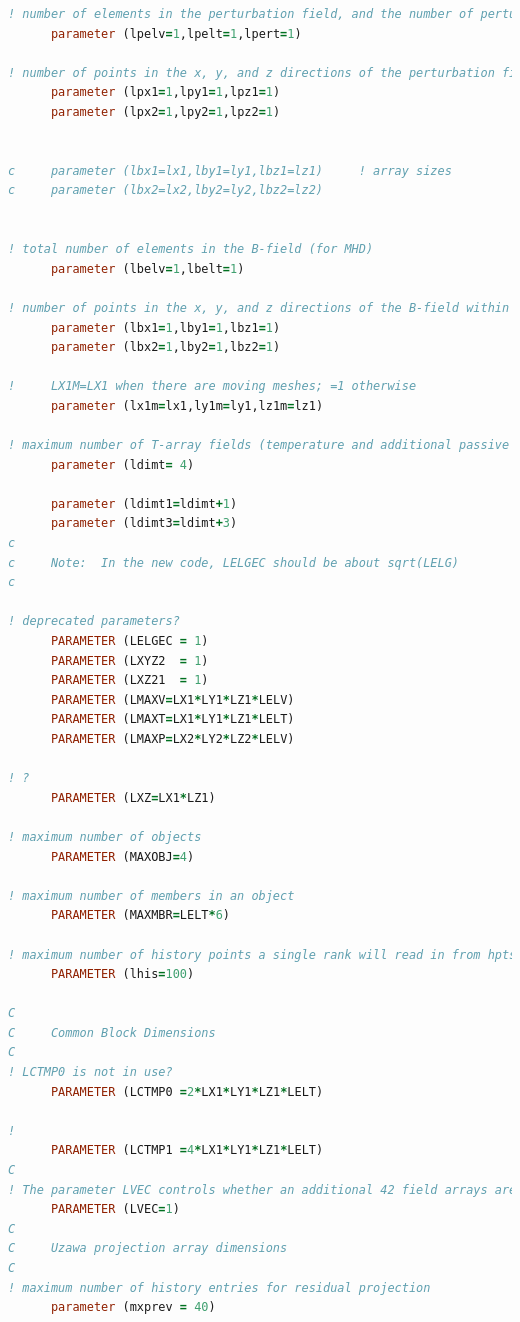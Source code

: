 \documentclass[10pt]{article}
\numberwithin{equation}{section} %
\begin{document}
\begin{itemize}
\begin{lstlisting}[language=Fortran]
! number of elements in the perturbation field, and the number of perturbation fields
      parameter (lpelv=1,lpelt=1,lpert=1)
   
! number of points in the x, y, and z directions of the perturbation field within each element of mesh 1 and mesh 2   
      parameter (lpx1=1,lpy1=1,lpz1=1)
      parameter (lpx2=1,lpy2=1,lpz2=1)


c     parameter (lbx1=lx1,lby1=ly1,lbz1=lz1)     ! array sizes
c     parameter (lbx2=lx2,lby2=ly2,lbz2=lz2)


! total number of elements in the B-field (for MHD)
      parameter (lbelv=1,lbelt=1)

! number of points in the x, y, and z directions of the B-field within each element of mesh 1 and mesh 2
      parameter (lbx1=1,lby1=1,lbz1=1)
      parameter (lbx2=1,lby2=1,lbz2=1)

!     LX1M=LX1 when there are moving meshes; =1 otherwise
      parameter (lx1m=lx1,ly1m=ly1,lz1m=lz1)

! maximum number of T-array fields (temperature and additional passive scalars)
      parameter (ldimt= 4)    

      parameter (ldimt1=ldimt+1)
      parameter (ldimt3=ldimt+3)
c
c     Note:  In the new code, LELGEC should be about sqrt(LELG)
c

! deprecated parameters?
      PARAMETER (LELGEC = 1)
      PARAMETER (LXYZ2  = 1)
      PARAMETER (LXZ21  = 1)
      PARAMETER (LMAXV=LX1*LY1*LZ1*LELV)
      PARAMETER (LMAXT=LX1*LY1*LZ1*LELT)
      PARAMETER (LMAXP=LX2*LY2*LZ2*LELV)

! ?      
      PARAMETER (LXZ=LX1*LZ1)

! maximum number of objects
      PARAMETER (MAXOBJ=4)

! maximum number of members in an object
      PARAMETER (MAXMBR=LELT*6)

! maximum number of history points a single rank will read in from hpts.in. lhis*np > npoints in hpts.in.
      PARAMETER (lhis=100)

C
C     Common Block Dimensions
C
! LCTMP0 is not in use?
      PARAMETER (LCTMP0 =2*LX1*LY1*LZ1*LELT)
      
! 
      PARAMETER (LCTMP1 =4*LX1*LY1*LZ1*LELT)
C
! The parameter LVEC controls whether an additional 42 field arrays are required for Steady State Solutions.  If you are not using Steady State, it is recommended that LVEC=1.
      PARAMETER (LVEC=1)
C
C     Uzawa projection array dimensions
C
! maximum number of history entries for residual projection
      parameter (mxprev = 40)


\end{lstlisting}
\end{itemize}
\end{document}
